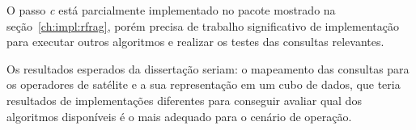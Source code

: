 O passo \textit{c} está parcialmente implementado no pacote mostrado na seção~\ref{ch:impl:rfrag}, porém precisa de trabalho significativo de implementação para executar outros algoritmos e realizar os testes das consultas relevantes.

Os resultados esperados da dissertação seriam: o mapeamento das consultas para os operadores de satélite e a sua representação em um cubo de dados, que teria resultados de implementações diferentes para conseguir avaliar qual dos algoritmos disponíveis é o mais adequado para o cenário de operação.




